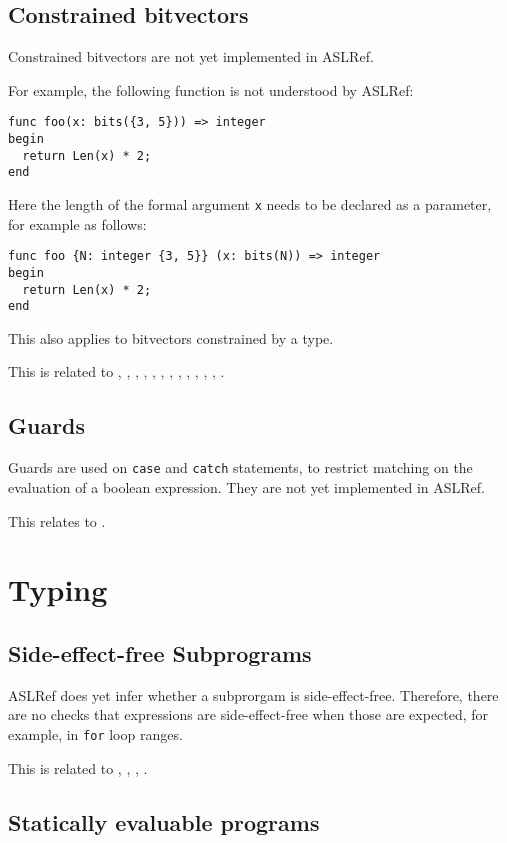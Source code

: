 \documentclass{book}
\begin{document}
\subsection{Constrained bitvectors}
Constrained bitvectors are not yet implemented in ASLRef.

For example, the following function is not understood by ASLRef:
\begin{Verbatim}
func foo(x: bits({3, 5})) => integer
begin
  return Len(x) * 2;
end
\end{Verbatim}
%
Here the length of the formal argument \Verb|x| needs to be declared as a
parameter, for example as follows:
\begin{Verbatim}
func foo {N: integer {3, 5}} (x: bits(N)) => integer
begin
  return Len(x) * 2;
end
\end{Verbatim}
%
This also applies to bitvectors constrained by a type.

This is related to , , , ,
, , , , ,
, , , .

\subsection{Guards}

Guards are used on \texttt{case} and \texttt{catch} statements, to restrict
matching on the evaluation of a boolean expression.
%
They are not yet implemented in ASLRef.

This relates to .

\section{Typing}

\subsection{Side-effect-free Subprograms}
ASLRef does yet infer whether a subprorgam is side-effect-free.
Therefore, there are no checks that expressions are side-effect-free when those are expected,
for example, in \texttt{for} loop ranges.

This is related to , , , .

\subsection{Statically evaluable programs}%
\label{sec:nyi:statically-evaluable-subprograms}
\end{document}
